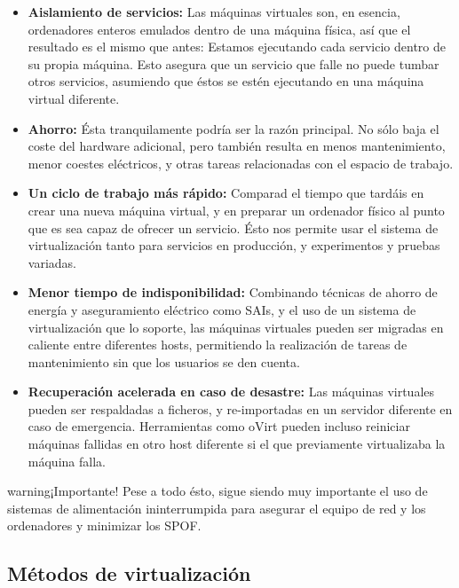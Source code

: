 \begin{itemize}
    \item \textbf{Aislamiento de servicios: }Las máquinas virtuales son, en esencia, ordenadores enteros emulados dentro de una máquina física, así que el resultado es el mismo que antes: Estamos ejecutando cada servicio dentro de su propia máquina. Esto asegura que un servicio que falle no puede tumbar otros servicios, asumiendo que éstos se estén ejecutando en una máquina virtual diferente. 

    \item \textbf{Ahorro: }Ésta tranquilamente podría ser la razón principal. No sólo baja el coste del hardware adicional, pero también resulta en menos mantenimiento, menor coestes eléctricos, y otras tareas relacionadas con el espacio de trabajo.

    \item \textbf{Un ciclo de trabajo más rápido: } Comparad el tiempo que tardáis en crear una nueva máquina virtual, y en preparar un ordenador físico al punto que es sea capaz de ofrecer un servicio. Ésto nos permite usar el sistema de virtualización tanto para servicios en producción, y experimentos y pruebas variadas.

    \item \textbf{Menor tiempo de indisponibilidad: }Combinando técnicas de ahorro de energía y aseguramiento eléctrico como SAIs, y el uso de un sistema de virtualización que lo soporte, las máquinas virtuales pueden ser migradas en caliente entre diferentes hosts, permitiendo la realización de tareas de mantenimiento sin que los usuarios se den cuenta.

    \item \textbf{Recuperación acelerada en caso de desastre: }Las máquinas virtuales pueden ser respaldadas a ficheros, y re-importadas en un servidor diferente en caso de emergencia. Herramientas como oVirt pueden incluso reiniciar máquinas fallidas en otro host diferente si el que previamente virtualizaba la máquina falla.
\end{itemize}

\begin{TMbulletin}{warning}{$¡$Importante!}
  Pese a todo ésto, sigue siendo muy importante el uso de sistemas de alimentación ininterrumpida para asegurar el equipo de red y los ordenadores y minimizar los SPOF.\@
\end{TMbulletin}

\subsection{Métodos de virtualización}
\label{subsubsec:virt_servers}

